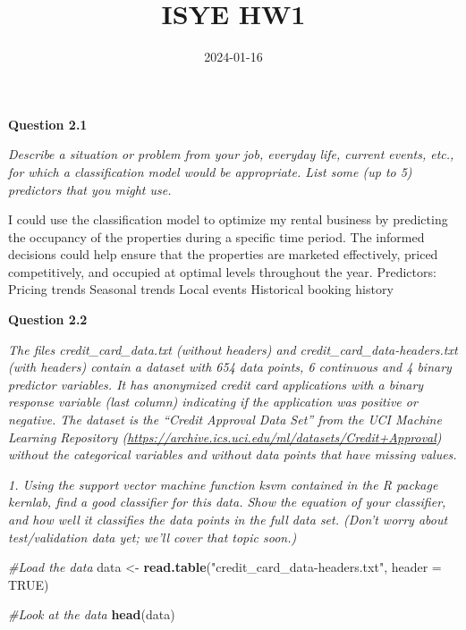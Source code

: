 \documentclass[
]{article}
\title{ISYE HW1}
\author{}
\date{\vspace{-2.5em}2024-01-16}
\newenvironment{Shaded}{\begin{snugshade}}{\end{snugshade}}
\newcommand{\AttributeTok}[1]{\textcolor[rgb]{0.13,0.29,0.53}{#1}}
\newcommand{\CommentTok}[1]{\textcolor[rgb]{0.56,0.35,0.01}{\textit{#1}}}
\newcommand{\ConstantTok}[1]{\textcolor[rgb]{0.56,0.35,0.01}{#1}}
\newcommand{\FunctionTok}[1]{\textcolor[rgb]{0.13,0.29,0.53}{\textbf{#1}}}
\newcommand{\NormalTok}[1]{#1}
\newcommand{\OtherTok}[1]{\textcolor[rgb]{0.56,0.35,0.01}{#1}}
\newcommand{\StringTok}[1]{\textcolor[rgb]{0.31,0.60,0.02}{#1}}
\begin{document}
\maketitle

\textbf{Question 2.1}

\emph{Describe a situation or problem from your job, everyday life,
current events, etc., for which a classification model would be
appropriate. List some (up to 5) predictors that you might use.}

I could use the classification model to optimize my rental business by
predicting the occupancy of the properties during a specific time
period. The informed decisions could help ensure that the properties are
marketed effectively, priced competitively, and occupied at optimal
levels throughout the year. Predictors: Pricing trends Seasonal trends
Local events Historical booking history

\textbf{Question 2.2}

\emph{The files credit\_card\_data.txt (without headers) and
credit\_card\_data-headers.txt (with headers) contain a dataset with 654
data points, 6 continuous and 4 binary predictor variables. It has
anonymized credit card applications with a binary response variable
(last column) indicating if the application was positive or negative.
The dataset is the ``Credit Approval Data Set'' from the UCI Machine
Learning Repository
(\url{https://archive.ics.uci.edu/ml/datasets/Credit+Approval}) without
the categorical variables and without data points that have missing
values.}

\emph{1. Using the support vector machine function ksvm contained in the
R package kernlab, find a good classifier for this data. Show the
equation of your classifier, and how well it classifies the data points
in the full data set. (Don't worry about test/validation data yet; we'll
cover that topic soon.)}

\begin{Shaded}
\begin{Highlighting}[]
\CommentTok{\#Load the data}
\NormalTok{data }\OtherTok{\textless{}{-}} \FunctionTok{read.table}\NormalTok{(}\StringTok{"credit\_card\_data{-}headers.txt"}\NormalTok{, }\AttributeTok{header =} \ConstantTok{TRUE}\NormalTok{)}
\end{Highlighting}
\end{Shaded}

\begin{Shaded}
\begin{Highlighting}[]
\CommentTok{\#Look at the data}
\FunctionTok{head}\NormalTok{(data) }
\end{Highlighting}
\end{Shaded}
\end{document}
